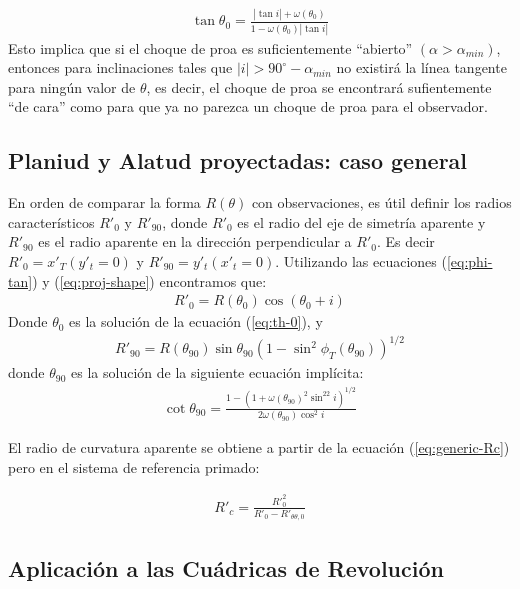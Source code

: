 \begin{align}
  \tan\theta_0 = \frac{|\tan i| + \omega(\theta_0)}{1 - \omega(\theta_0)|\tan i|}
  \label{eq:th-0}
\end{align}
Esto implica que si el choque de proa es suficientemente ``abierto'' $(\alpha > \alpha_{min})$, entonces para inclinaciones tales que
$|i| > 90^\circ - \alpha_{min}$ no existirá la línea tangente para ningún valor de $\theta$, es decir, el choque de proa se encontrará sufientemente ``de cara'' como para que ya no parezca un choque de proa para el observador.

\subsection{Planiud y Alatud proyectadas: caso general}

En orden de comparar la forma $R(\theta)$ con observaciones, es útil definir los radios característicos $R'_0$ y $R'_{90}$, donde $R'_0$ es el radio del eje de simetría aparente y $R'_{90}$ es el radio aparente en la dirección perpendicular a $R'_0$. Es decir
$R'_0 = x'_T(y'_t=0)$ y $R'_{90} = y'_t(x'_t = 0)$. Utilizando las ecuaciones (\ref{eq:phi-tan}) y (\ref{eq:proj-shape}) encontramos que:
\begin{align}
R'_0 = R(\theta_0)\cos(\theta_0 + i)
\label{eq:R0p}
\end{align}
Donde $\theta_0$ es la solución de la ecuación (\ref{eq:th-0}), y
\begin{align}
  R'_{90} = R(\theta_{90})\sin\theta_{90}\left(1-\sin^2\phi_T(\theta_{90})\right)^{1/2}
  \label{eq:R90p}
\end{align}
donde $\theta_{90}$ es la solución de la siguiente ecuación implícita:
\begin{align}
  \cot\theta_{90} = \frac{1 - \left(1+\omega(\theta_{90})^2\sin^22i\right)^{1/2}}
  {2\omega(\theta_{90})\cos^2i}
  \label{eq:th90}
\end{align}

El radio de curvatura aparente se obtiene a partir de la ecuación (\ref{eq:generic-Rc}) pero en el sistema de referencia primado:

\begin{align}
  R'_c = \frac{R'^2_0}{R'_0 - R'_{\theta\theta, 0}} \label{eq:Rc-prime}
\end{align}

\subsection{Aplicación a las Cuádricas de Revolución}

